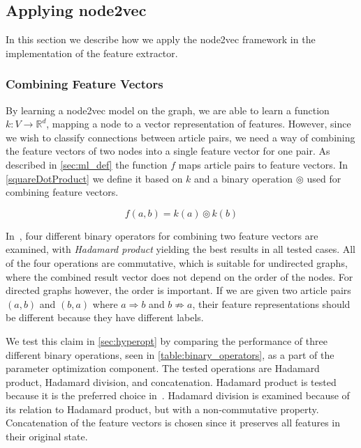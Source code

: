 \subsection{Applying node2vec}
In this section we describe how we apply the node2vec framework in the implementation of the feature extractor.

\subsubsection{Combining Feature Vectors}\label{subsub:combining_feature_vectors}
By learning a node2vec model on the graph, we are able to learn a function $k:V \to \mathbb{R}^d$, mapping a node to a vector representation of features. However, since we wish to classify connections between article pairs, we need a way of combining the feature vectors of two nodes into a single feature vector for one pair. As described in \cref{sec:ml_def} the function $f$ maps article pairs to feature vectors. In \cref{squareDotProduct} we define it based on $k$ and a binary operation $\circledcirc$ used for combining feature vectors.

\begin{equation}\label{squareDotProduct}
f(a,b) = k(a) \circledcirc k(b)
\end{equation}

In~\cite{node2vec}, four different binary operators for combining two feature vectors are examined, with \emph{Hadamard product} yielding the best results in all tested cases.
All of the four operations are commutative, which is suitable for undirected graphs, where the combined result vector does not depend on the order of the nodes. For directed graphs however, the order is important. If we are given two article pairs $(a,b)$ and $(b,a)$ where $a \Rightarrow b$ and $b \not \Rightarrow a$, their feature representations should be different because they have different labels. 

We test this claim in \cref{sec:hyperopt} by comparing the performance of three different binary operations, seen in \cref{table:binary_operators}, as a part of the parameter optimization component. The tested operations are Hadamard product, Hadamard division, and concatenation. Hadamard product is tested because it is the preferred choice in~\cite{node2vec}. Hadamard division is examined because of its relation to Hadamard product, but with a non-commutative property. Concatenation of the feature vectors is chosen since it preserves all features in their original state.

